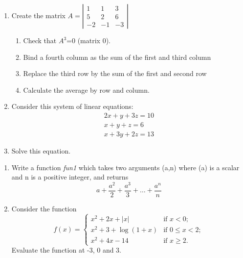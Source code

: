\documentclass[11pt,a4paper]{article}
\newcommand{\1}{\mathbb{1}}
\begin{document}
\begin{Exercise}[title=Matrix]
\begin{enumerate}
\item Create the matrix $A  = \left| \begin{array}{ccc}
 1 & 1 & 3 \\
5  & 2 & 6 \\
-2 &-1 & -3 \end{array} \right|$
\begin{enumerate}
\item Check that $A^3$=0 (matrix 0).
\item Bind a fourth column as the sum of the first and third column
\item Replace the third row by the sum of the first and second row
\item Calculate the average by row and column. 
\end{enumerate}
\item Consider this system of linear equations: 
\begin{eqnarray}
2x  +   y  +  3z  =  10   \\ 
 x  +   y  +   z  =   6   \\
 x  +  3y  +  2z  =  13 
 \end{eqnarray}
 \item Solve this equation. 
\end{enumerate}
\end{Exercise}

\begin{Exercise}[title=Functions]
 \begin{enumerate}
 \item Write a function \emph{fun1} which takes two arguments (a,n) where (a) is a scalar and n is a positive integer, and returns
 \begin{equation*}
 a+\dfrac{a^2}{2}+\dfrac{a^3}{3} + \ldots + \dfrac{a^n}{n}
 \end{equation*}
 \item Consider the function 
 \begin{equation}
f(x)  = \left\{ \begin{array}{ll}
         x^2+2x+|x| & \mbox{if $x < 0$};\\
         x^2+3 + \log(1+x) & \mbox{if $0 \leq x < 2$};\\
         x^2 + 4x -14 & \mbox{if $x \geq 2$}.\end{array} \right. 
 \end{equation}
Evaluate the function at -3, 0 and 3. 
\end{enumerate}
\end{Exercise}
\end{document}
